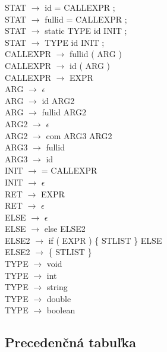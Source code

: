 \documentclass[11pt,a4paper]{article}
\begin{document}
STAT $\rightarrow$ id = CALLEXPR ; \\
STAT $\rightarrow$ fullid = CALLEXPR ; \\
STAT $\rightarrow$ static TYPE id INIT ; \\
STAT $\rightarrow$ TYPE id INIT ; \\
CALLEXPR $\rightarrow$ fullid ( ARG ) \\
CALLEXPR $\rightarrow$ id ( ARG ) \\
CALLEXPR $\rightarrow$ EXPR \\
ARG $\rightarrow$ $\epsilon$ \\
ARG $\rightarrow$ id ARG2 \\
ARG $\rightarrow$ fullid ARG2 \\
ARG2 $\rightarrow$ $\epsilon$ \\
ARG2 $\rightarrow$ com ARG3 ARG2 \\
ARG3 $\rightarrow$ fullid \\
ARG3 $\rightarrow$ id \\
INIT $\rightarrow$ = CALLEXPR \\
INIT $\rightarrow$ $\epsilon$ \\
RET $\rightarrow$ EXPR \\
RET $\rightarrow$ $\epsilon$ \\
ELSE $\rightarrow$ $\epsilon$ \\
ELSE $\rightarrow$ else ELSE2 \\
ELSE2 $\rightarrow$ if ( EXPR ) \{ STLIST \} ELSE \\
ELSE2 $\rightarrow$ \{ STLIST \} \\
TYPE $\rightarrow$ void \\
TYPE $\rightarrow$ int \\
TYPE $\rightarrow$ string \\
TYPE $\rightarrow$ double \\
TYPE $\rightarrow$ boolean \\

\newpage
\subsection{Precedenčná tabuľka}
\end{document}
